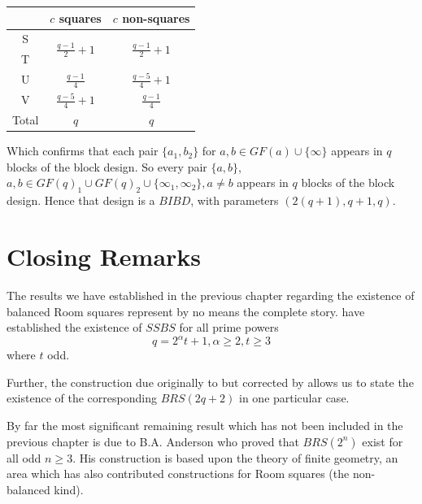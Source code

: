 \documentclass[
  11pt,
  a4paper]{book}
\begin{document}
\begin{center}
\begin{tabular}{c|cc}
       & $c$ squares & $c$ non-squares \\ \hline
 S     & \multirow{2}{*}{$\frac{q - 1}{2} + 1$} & \multirow{2}{*}{$\frac{q - 1}{2} + 1$}                                  \\
 T     &                       &                       \\
 U     & $\frac{q - 1}{4}$     & $\frac{q - 5}{4} + 1$ \\
 V     & $\frac{q - 5}{4} + 1$ & $\frac{q - 1}{4}$     \\ \hline
 Total &        $q$            &      $q$
\end{tabular}
\end{center}

Which confirms that each pair \(\{a_1, b_2\}\) for
\(a, b \in GF(a) \cup \{\infty\}\) appears in \(q\) blocks of the block
design. So every pair \(\{a, b\}\),
\(a, b \in GF(q)_1 \cup GF(q)_2 \cup \{\infty _1, \infty _2\}, a \neq b\)
appears in \(q\) blocks of the block design. Hence that design is a
\(BIBD\), with parameters \((2(q + 1), q + 1, q)\).

\hypertarget{closing-remarks}{%
\chapter{Closing Remarks}\label{closing-remarks}}

The results we have established in the previous chapter regarding the
existence of balanced Room squares represent by no means the complete
story. \textcite{du_existence_1988} have established the existence of
\(SSBS\) for all prime powers \begin{equation}
q = 2^{\alpha}t + 1, \alpha \geq 2, t \geq 3
\end{equation} where \(t\) odd.

Further, the construction due originally to
\textcite{hwang_complete_1984} but corrected by
\textcite{anderson_construction_1999} allows us to state the existence
of the corresponding \(BRS(2q + 2)\) in one particular case.

By far the most significant remaining result which has not been included
in the previous chapter is due to B.A. Anderson who proved that
\(BRS(2^n)\) exist for all odd \(n \geq 3\). His construction is based
upon the theory of finite geometry, an area which has also contributed
constructions for Room squares (the non-balanced kind).
\end{document}

